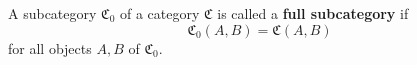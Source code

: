 A subcategory $\mathfrak{C}_0$ of a category $\mathfrak{C}$ is called a \textbf{full subcategory} if
$$\mathfrak{C}_0(A, B) = \mathfrak{C}(A, B)$$
for all objects $A, B$ of $\mathfrak{C}_0$.
